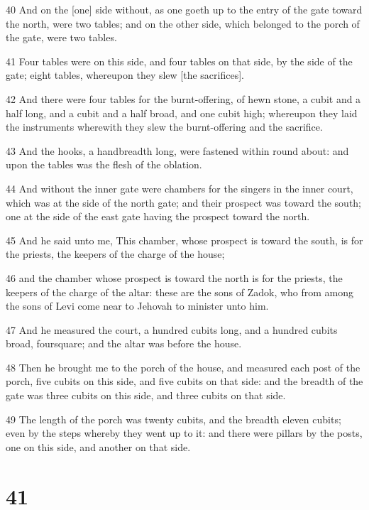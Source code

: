 \par 40 And on the [one] side without, as one goeth up to the entry of the gate toward the north, were two tables; and on the other side, which belonged to the porch of the gate, were two tables.
\par 41 Four tables were on this side, and four tables on that side, by the side of the gate; eight tables, whereupon they slew [the sacrifices].
\par 42 And there were four tables for the burnt-offering, of hewn stone, a cubit and a half long, and a cubit and a half broad, and one cubit high; whereupon they laid the instruments wherewith they slew the burnt-offering and the sacrifice.
\par 43 And the hooks, a handbreadth long, were fastened within round about: and upon the tables was the flesh of the oblation.
\par 44 And without the inner gate were chambers for the singers in the inner court, which was at the side of the north gate; and their prospect was toward the south; one at the side of the east gate having the prospect toward the north.
\par 45 And he said unto me, This chamber, whose prospect is toward the south, is for the priests, the keepers of the charge of the house;
\par 46 and the chamber whose prospect is toward the north is for the priests, the keepers of the charge of the altar: these are the sons of Zadok, who from among the sons of Levi come near to Jehovah to minister unto him.
\par 47 And he measured the court, a hundred cubits long, and a hundred cubits broad, foursquare; and the altar was before the house.
\par 48 Then he brought me to the porch of the house, and measured each post of the porch, five cubits on this side, and five cubits on that side: and the breadth of the gate was three cubits on this side, and three cubits on that side.
\par 49 The length of the porch was twenty cubits, and the breadth eleven cubits; even by the steps whereby they went up to it: and there were pillars by the posts, one on this side, and another on that side.

\chapter{41}


